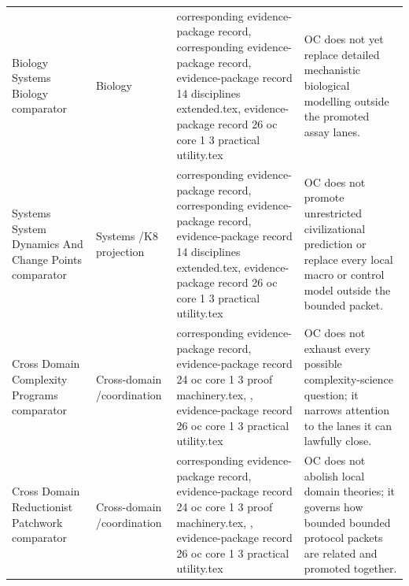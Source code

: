 \begin{longtable}{@{}L{0.20\textwidth}L{0.11\textwidth}L{0.33\textwidth}L{0.28\textwidth}@{}}
Biology Systems Biology comparator & Biology & corresponding evidence-package record, corresponding evidence-package record, \allowbreak evidence-package record 14 disciplines extended.tex, \allowbreak evidence-package record 26 oc core 1 3 practical utility.tex & OC does not yet replace detailed mechanistic biological modelling outside the promoted assay lanes. \\
Systems System Dynamics And Change Points comparator & Systems /\allowbreak K8 projection & corresponding evidence-package record, corresponding evidence-package record, \allowbreak evidence-package record 14 disciplines extended.tex, \allowbreak evidence-package record 26 oc core 1 3 practical utility.tex & OC does not promote unrestricted civilizational prediction or replace every local macro or control model outside the bounded packet. \\
Cross Domain Complexity Programs comparator & Cross-domain /\allowbreak coordination & corresponding evidence-package record, \allowbreak evidence-package record 24 oc core 1 3 proof machinery.tex, \allowbreak {}, \allowbreak evidence-package record 26 oc core 1 3 practical utility.tex & OC does not exhaust every possible complexity-science question; it narrows attention to the lanes it can lawfully close. \\
Cross Domain Reductionist Patchwork comparator & Cross-domain /\allowbreak coordination & corresponding evidence-package record, \allowbreak evidence-package record 24 oc core 1 3 proof machinery.tex, \allowbreak {}, \allowbreak evidence-package record 26 oc core 1 3 practical utility.tex & OC does not abolish local domain theories; it governs how bounded bounded protocol packets are related and promoted together. \\
\bottomrule
\end{longtable}

